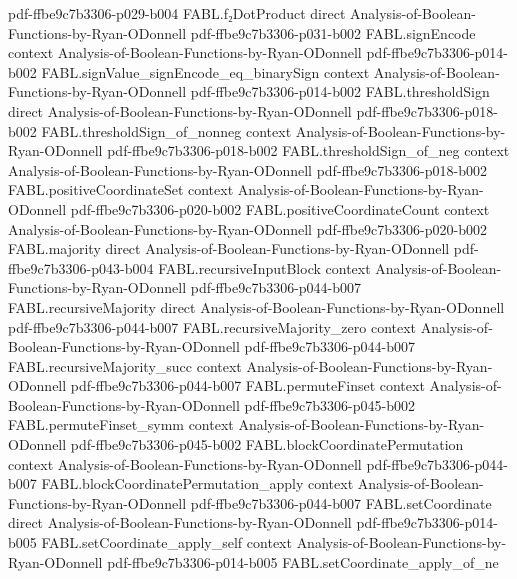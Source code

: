 \begin{theorem}
  {pdf-ffbe9c7b3306-p029-b004}
\proofstep
  {FABL.f₂DotProduct}
  {direct}
  {Analysis-of-Boolean-Functions-by-Ryan-ODonnell}
  {pdf-ffbe9c7b3306-p031-b002}
\proofstep
  {FABL.signEncode}
  {context}
  {Analysis-of-Boolean-Functions-by-Ryan-ODonnell}
  {pdf-ffbe9c7b3306-p014-b002}
\proofstep
  {FABL.signValue_signEncode_eq_binarySign}
  {context}
  {Analysis-of-Boolean-Functions-by-Ryan-ODonnell}
  {pdf-ffbe9c7b3306-p014-b002}
\proofstep
  {FABL.thresholdSign}
  {direct}
  {Analysis-of-Boolean-Functions-by-Ryan-ODonnell}
  {pdf-ffbe9c7b3306-p018-b002}
\proofstep
  {FABL.thresholdSign_of_nonneg}
  {context}
  {Analysis-of-Boolean-Functions-by-Ryan-ODonnell}
  {pdf-ffbe9c7b3306-p018-b002}
\proofstep
  {FABL.thresholdSign_of_neg}
  {context}
  {Analysis-of-Boolean-Functions-by-Ryan-ODonnell}
  {pdf-ffbe9c7b3306-p018-b002}
\proofstep
  {FABL.positiveCoordinateSet}
  {context}
  {Analysis-of-Boolean-Functions-by-Ryan-ODonnell}
  {pdf-ffbe9c7b3306-p020-b002}
\proofstep
  {FABL.positiveCoordinateCount}
  {context}
  {Analysis-of-Boolean-Functions-by-Ryan-ODonnell}
  {pdf-ffbe9c7b3306-p020-b002}
\proofstep
  {FABL.majority}
  {direct}
  {Analysis-of-Boolean-Functions-by-Ryan-ODonnell}
  {pdf-ffbe9c7b3306-p043-b004}
\proofstep
  {FABL.recursiveInputBlock}
  {context}
  {Analysis-of-Boolean-Functions-by-Ryan-ODonnell}
  {pdf-ffbe9c7b3306-p044-b007}
\proofstep
  {FABL.recursiveMajority}
  {direct}
  {Analysis-of-Boolean-Functions-by-Ryan-ODonnell}
  {pdf-ffbe9c7b3306-p044-b007}
\proofstep
  {FABL.recursiveMajority_zero}
  {context}
  {Analysis-of-Boolean-Functions-by-Ryan-ODonnell}
  {pdf-ffbe9c7b3306-p044-b007}
\proofstep
  {FABL.recursiveMajority_succ}
  {context}
  {Analysis-of-Boolean-Functions-by-Ryan-ODonnell}
  {pdf-ffbe9c7b3306-p044-b007}
\proofstep
  {FABL.permuteFinset}
  {context}
  {Analysis-of-Boolean-Functions-by-Ryan-ODonnell}
  {pdf-ffbe9c7b3306-p045-b002}
\proofstep
  {FABL.permuteFinset_symm}
  {context}
  {Analysis-of-Boolean-Functions-by-Ryan-ODonnell}
  {pdf-ffbe9c7b3306-p045-b002}
\proofstep
  {FABL.blockCoordinatePermutation}
  {context}
  {Analysis-of-Boolean-Functions-by-Ryan-ODonnell}
  {pdf-ffbe9c7b3306-p044-b007}
\proofstep
  {FABL.blockCoordinatePermutation_apply}
  {context}
  {Analysis-of-Boolean-Functions-by-Ryan-ODonnell}
  {pdf-ffbe9c7b3306-p044-b007}
\proofstep
  {FABL.setCoordinate}
  {direct}
  {Analysis-of-Boolean-Functions-by-Ryan-ODonnell}
  {pdf-ffbe9c7b3306-p014-b005}
\proofstep
  {FABL.setCoordinate_apply_self}
  {context}
  {Analysis-of-Boolean-Functions-by-Ryan-ODonnell}
  {pdf-ffbe9c7b3306-p014-b005}
\proofstep
  {FABL.setCoordinate_apply_of_ne}

\end{theorem}

